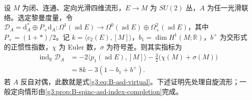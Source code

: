 \begin{theorem}\label{g3:thm:B-asd-expected-dimension}
 设 \(M\) 为闭、连通、定向光滑四维流形，\(E\to M\) 为 \(SU(2)\) 丛，\(A\) 为任一光滑联络。选定黎曼度量，令 \(\mathcal D_A=\mathrm d_A^*\oplus P_+\mathrm d_A:\Omega^1(\operatorname{ad}E)\to\Omega^0(\operatorname{ad}E)\oplus\Omega^2_+(\operatorname{ad}E)\)，其中 \(P_+=(1+*)/2\)。记 \(k=\langle c_2(E),[M]\rangle\)，\(b_1=\dim H^1(M;\mathbb R)\)，\(b^+\) 为交形式的正惯性指数，\(\chi\) 为 Euler 数，\(\sigma\) 为符号差。则其实指标为
 \begin{equation}\label{g3:eq:B-asd-index}
 \begin{aligned}
 \operatorname{ind}_{\mathbb R}\mathcal D_A
 &=-2\langle p_1(\operatorname{ad}E),[M]\rangle
       -\frac32\bigl(\chi(M)+\sigma(M)\bigr)\\
 &=8k-3(1-b_1+b^+).
 \end{aligned}
 \end{equation}
 若 \(A\) 反自对偶，此数就是式\eqref{g3:eq:B-asd-virtual}。下述证明先处理自旋流形；一般定向情形由\cref{g3:prop:B-spinc-asd-index-completion}完成。
\end{theorem}
